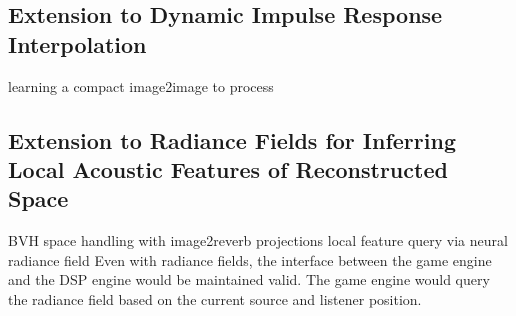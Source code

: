 \subsection{Extension to Dynamic Impulse Response Interpolation}
learning a compact image2image to process 

\subsection{Extension to Radiance Fields for Inferring Local Acoustic Features of Reconstructed Space}

BVH space handling with image2reverb projections
local feature query via neural radiance field
Even with radiance fields, the interface between the game engine and the DSP engine would be maintained valid. The game engine would query the radiance field based on the current source and listener position.

